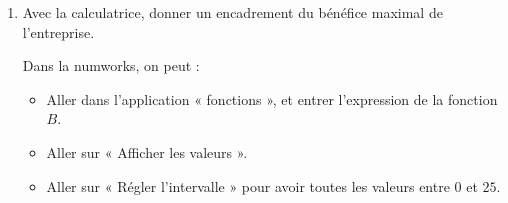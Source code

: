 \documentclass[
	classe=$1^{ere}STI2D$,
	headerTitle=Activité,
	twocolumn,
	landscape
]{exercice}
\begin{document}
{\begin{enumerate}
	      Remplir alors la dernière ligne du tableau de signes.
	\item Avec la calculatrice, donner un encadrement du bénéfice maximal de l'entreprise. \medskip
	
	Dans la numworks, on peut :
	
	\begin{itemize}
		\item Aller dans l'application « fonctions », et entrer l'expression de la fonction $B$.
		\item Aller sur « Afficher les valeurs ».
		\item Aller sur « Régler l'intervalle » pour avoir toutes les valeurs entre $0$ et $25$.
	\end{itemize}

	      \ifdefined\makeCorrection
		      \newcommand{\cellWidth}{1.2}
		      \begin{center}
		      \end{center}
	      \fi
\end{enumerate}
}

\Enonce

\ifdefined\makeCorrection
\else
\newpage
\Enonce
\fi
\end{document}

